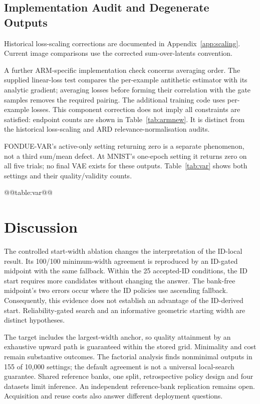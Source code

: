 \subsection{Implementation Audit and Degenerate Outputs}
Historical loss-scaling corrections are documented in
Appendix~\ref{app:scaling}. Current image comparisons use the corrected
sum-over-latents convention.

A further ARM-specific implementation check concerns averaging order.
The supplied linear-loss test compares the per-example antithetic
estimator with its analytic gradient; averaging losses before forming
their correlation with the gate samples removes the required pairing.
The additional training code uses per-example losses. This component
correction does not imply all constraints are satisfied: endpoint
counts are shown in Table~\ref{tab:armnew}. It is distinct from the
historical loss-scaling and ARD relevance-normalisation audits.

FONDUE-VAR's active-only setting returning zero is a separate phenomenon,
not a third sum/mean defect. At MNIST's one-epoch setting it returns zero
on all five trials; no final VAE exists for these outputs.
Table~\ref{tab:var} shows both settings and their quality/validity counts.

@@table:var@@

\section{Discussion}\label{sec:discussion}
The controlled start-width ablation changes the interpretation of the
ID-local result. Its 100/100 minimum-width agreement is reproduced by
an ID-gated midpoint with the same fallback. Within the 25 accepted-ID
conditions, the ID start requires more candidates without changing the
answer. The bank-free midpoint's two errors occur where the ID policies
use ascending fallback. Consequently, this evidence does not establish
an advantage of the ID-derived start. Reliability-gated search and an
informative geometric starting width are distinct hypotheses.

The target includes the largest-width anchor, so quality attainment by
an exhaustive upward path is guaranteed within the stored grid.
Minimality and cost remain substantive outcomes. The factorial analysis
finds nonminimal outputs in 155 of 10,000 settings; the default agreement
is not a universal local-search guarantee. Shared reference banks, one
split, retrospective policy design and four datasets limit inference.
An independent reference-bank replication remains open. Acquisition
and reuse costs also answer different deployment questions.

